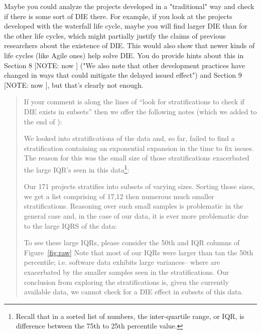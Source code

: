 Maybe you could analyze the projects developed in a
"traditional" way and check if there is some sort of DIE
there. For example, if you look at the projects developed
with the waterfall life cycle, maybe you will find larger
DIE than for the other life cycles, which might partially
justify the claims of previous researchers about the
existence of DIE. This would also show that newer kinds of
life cycles (like Agile ones) help solve DIE. You do provide
hints about this in Section 8 [NOTE: now ] ("We also note that other
development practices have changed in ways that could
mitigate the delayed issued effect") and Section 9 [NOTE: now ], but
that's clearly not enough.
\begin{quote}{\em

If your comment is along the lines of ``look for stratifications to check if
DIE exists in subsets'' then we offer the following notes (which we added to the end of ):

We looked into   stratifications of the data and, so far,   failed to find a stratification
containing an exponential expansion in the time to fix issues. The reason for this was  the small size
of those stratifications  exacerbated the large IQR's seen in this data\footnote{Recall that in a sorted list of numbers,
the inter-quartile range, or IQR, is difference between the 
  75th to 25th percentile value.}:
\bi
\item
Our 171 projects   stratifies into subsets of varying sizes. Sorting those sizes, we get a list
comprising of 17,12 then numerous much smaller stratifications.  Reasoning over such small samples
is problematic in the general case and, in the case of our data, it is ever more problematic due to
the large IQRS of the data:
\item
To see these large IQRs,  please consider the 50th and IQR columns of Figure~\ref{fig:raw} Note that most of our IQRs were larger than tan the 50th percentile; i.e. software
data exhibits large variances-- where are exacerbated by the smaller samples seen in the stratifications.
\ei
Our conclusion from exploring the stratifications is, given the currently available data, we cannot check
for a DIE effect in subsets of this data.
}
\end{quote}
